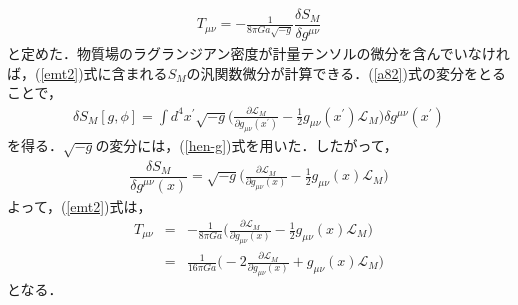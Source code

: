 \begin{eqnarray}
\label{emt2}
T_{\mu\nu}=-\frac{1}{8\pi Ga\sqrt{-g}}\dfrac{\delta S_{M}}{\delta g^{\mu\nu}}
\end{eqnarray}
と定めた．物質場のラグランジアン密度が計量テンソルの微分を含んでいなければ，(\ref{emt2})式に含まれる$S_{M}$の汎関数微分が計算できる．(\ref{a82})式の変分をとることで，
\begin{eqnarray}
\delta S_{M}[g,\phi]=\int d^4x^{\prime} \sqrt{-g}\biggl(\frac{\partial \mathcal{L}_{M}}{\partial g_{\mu\nu}(x^{\prime})}-\frac{1}{2}g_{\mu\nu}(x^{\prime})\mathcal{L}_{M}\biggr)\delta g^{\mu\nu}(x^{\prime})
\end{eqnarray}
を得る．$\sqrt{-g}$の変分には，(\ref{hen-g})式を用いた．したがって，
\begin{eqnarray}
\dfrac{\delta S_{M}}{\delta g^{\mu\nu}(x)}=\sqrt{-g}\biggl(\frac{\partial \mathcal{L}_{M}}{\partial g_{\mu\nu}(x)}-\frac{1}{2}g_{\mu\nu}(x)\mathcal{L}_{M}\biggr)
\end{eqnarray}
よって，(\ref{emt2})式は，
\begin{eqnarray}
\label{emt3}
T_{\mu\nu}&=&-\frac{1}{8\pi Ga}\biggl(\frac{\partial \mathcal{L}_{M}}{\partial g_{\mu\nu}(x)}-\frac{1}{2}g_{\mu\nu}(x)\mathcal{L}_{M}\biggr) \nonumber \\
&=&\frac{1}{16\pi Ga}\biggl(-2\frac{\partial \mathcal{L}_{M}}{\partial g_{\mu\nu}(x)}+g_{\mu\nu}(x)\mathcal{L}_{M}\biggr)
\end{eqnarray}
となる．

